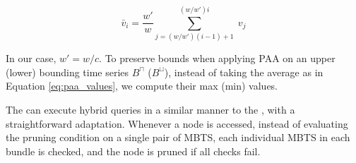 \begin{equation}
 \bar{v}_i = \frac{w'}{w} \sum_{j = (w/w')(i-1)+1}^{(w/w')i} \; v_j
 \label{eq:paa_values}
\end{equation}

In our case, $w' = w / c$. To preserve bounds when applying PAA on an upper (lower) bounding time series $B^{\sqcap}$ ($B^{\sqcup}$), instead of taking the average as in Equation \ref{eq:paa_values}, we compute their max (min) values.

The \btsr can execute hybrid queries in a similar manner to the \tsr, with a straightforward adaptation. Whenever a node is accessed, instead of evaluating the pruning condition on a single pair of MBTS, each individual MBTS in each bundle is checked, and the node is pruned if all checks fail.
